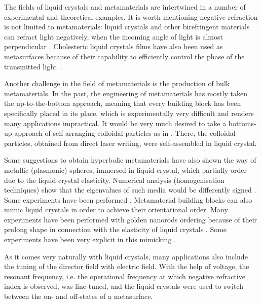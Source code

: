 \documentclass[a4paper,11pt]{article}
\begin{document}
The fields of liquid crystals and metamaterials are intertwined in a number of experimental and theoretical examples. 
It is worth mentioning negative refraction is not limited to metamaterials: liquid crystals and other birefringent materials can refract light negatively, when the incoming angle of light is almost perpendicular \cite{lavrentovich-2006-lc-neg}.
Cholesteric liquid crystals films have also been used as metasurfaces because of their capability to efficiently control the phase of the transmitted light \cite{ozaki-2016-patterned-lc}.


Another challenge in the field of metamaterials is the production of bulk metamaterials. 
In the past, the engineering of metamaterials has mostly taken the up-to-the-bottom approach, meaning that every building block has been specifically placed in its place, which is experimentally very difficult and renders many applications impractical. 
It would be very much desired to take a bottoms-up approach of self-arranging colloidal particles as in \cite{tartan}. 
There, the colloidal particles, obtained from direct laser writing, were self-assembled in liquid crystal. 

Some suggestions to obtain hyperbolic metamaterials have also shown the way of metallic (plasmonic) spheres, immersed in liquid crystal, which partially order due to the liquid crystal elasticity. 
Numerical analysis (homogenisation techniques) show that the eigenvalues of such media would be differently signed \cite{khoo}. 
Some experiments have been performed \cite{ponsinet-virginie?}. 
Metamaterial building blocks can also mimic liquid crystals in order to achieve their orientational order. 
Many experiments have been performed with golden nanorods ordering because of their prolong shape in connection with the elasticity of liquid crystals \cite{nanoparticles}. 
Some experiments have been very explicit in this mimicking \cite{shadrivov}. 

As it comes very naturally with liquid crystals, many applications also include the tuning of the director field with electric field. 
With the help of voltage, the resonant frequency, i.e. the operational frequency at which negative refractive index is observed, was fine-tuned, and the liquid crystals were used to switch between the on- and off-states of a metasurface. 
\end{document}
